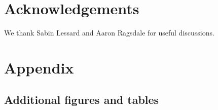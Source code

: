 \documentclass[9pt,twocolumn,twoside,lineno]{gsajnl}
\begin{document}

\section{Acknowledgements}
We thank Sabin Lessard and Aaron Ragsdale for useful discussions. 



\newcommand{\beginsupplement}{%
        \setcounter{table}{0}
        \renewcommand{\thetable}{S\arabic{table}}%
        \setcounter{figure}{0}
        \renewcommand{\thefigure}{S\arabic{figure}}%
        \setcounter{section}{0}
        \renewcommand{\thesection}{S\arabic{section}}%
     }
\beginsupplement
\section{Appendix}

\subsection{Additional figures and tables}
\label{subsec_apx_figures}
\end{document}
